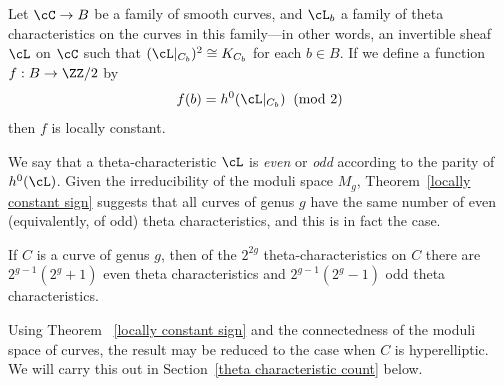  \begin{theorem}\label{locally constant sign} Let $\cC \to B$ be a family of smooth curves, and $\cL_b$ a family of theta characteristics on the curves in this family---in other words, an invertible sheaf $\cL$ on $\cC$ such that $(\cL|_{C_b})^2 \cong K_{C_b}$ for each $b \in B$. If we define a function $f : B \to \ZZ/2$  by
 $$
 f(b) = h^0(\cL|_{C_b}) \;  \; (\text{mod } 2)
 $$
then $f$ is locally constant.
\end{theorem}

We say that a theta-characteristic $\cL$ is \emph{even} or \emph{odd} according to the parity of $h^0(\cL)$. Given the irreducibility of the moduli space $M_g$,  Theorem~\ref{locally constant sign} suggests that all curves of genus $g$ have the same number of even (equivalently, of odd) theta characteristics, and this is in fact the case. 

\begin{theorem}\label{number of theta characteristics}
If $C$ is a curve of genus $g$, then of the $2^{2g}$ theta-characteristics on $C$ there are $2^{g-1}(2^g + 1)$ even theta characteristics and $2^{g-1}(2^g-1)$ odd theta characteristics.
\end{theorem}

Using Theorem ~\ref{locally constant sign} and the connectedness of the moduli space of curves, 
the result may be reduced to the case when $C$ is hyperelliptic. We will carry this out in Section~\ref{theta characteristic count} below.



